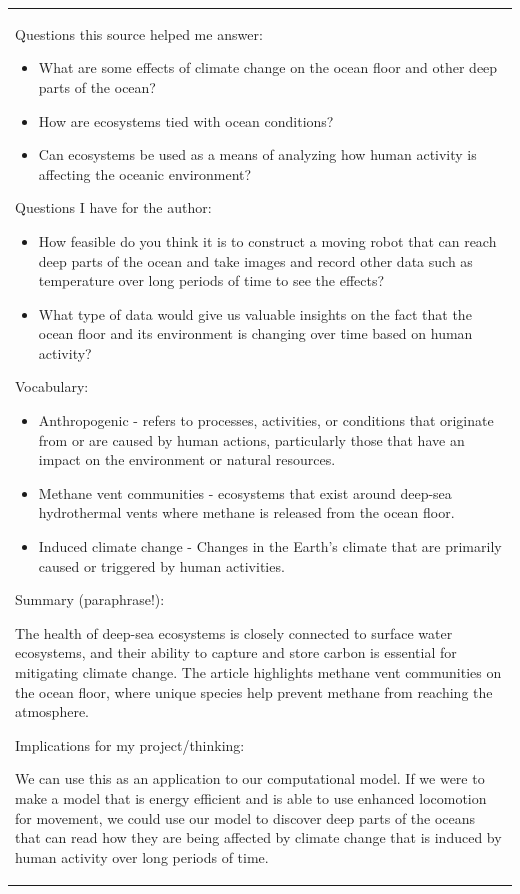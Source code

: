 \begin{longtable}[]{@{}
  >{\raggedright\arraybackslash}p{}@{}}
Questions this source helped me answer:

\begin{itemize}
\item
  What are some effects of climate change on the ocean floor and other
  deep parts of the ocean?
\item
  How are ecosystems tied with ocean conditions?
\item
  Can ecosystems be used as a means of analyzing how human activity is
  affecting the oceanic environment?
\end{itemize}


Questions I have for the author:

\begin{itemize}
\item
  How feasible do you think it is to construct a moving robot that can
  reach deep parts of the ocean and take images and record other data
  such as temperature over long periods of time to see the effects?
\item
  What type of data would give us valuable insights on the fact that the
  ocean floor and its environment is changing over time based on human
  activity?
\end{itemize}


Vocabulary:

\begin{itemize}
\item
  Anthropogenic - refers to processes, activities, or conditions that
  originate from or are caused by human actions, particularly those that
  have an impact on the environment or natural resources.
\item
  Methane vent communities - ecosystems that exist around deep-sea
  hydrothermal vents where methane is released from the ocean floor.
\item
  Induced climate change - Changes in the Earth's climate that are
  primarily caused or triggered by human activities.
\end{itemize}


Summary (paraphrase!):

The health of deep-sea ecosystems is closely connected to surface water
ecosystems, and their ability to capture and store carbon is essential
for mitigating climate change. The article highlights methane vent
communities on the ocean floor, where unique species help prevent
methane from reaching the atmosphere.


Implications for my project/thinking:

We can use this as an application to our computational model. If we were
to make a model that is energy efficient and is able to use enhanced
locomotion for movement, we could use our model to discover deep parts
of the oceans that can read how they are being affected by climate
change that is induced by human activity over long periods of time.

\midrule\noalign{}
\endhead
\bottomrule\noalign{}
\endlastfoot
\end{longtable}


